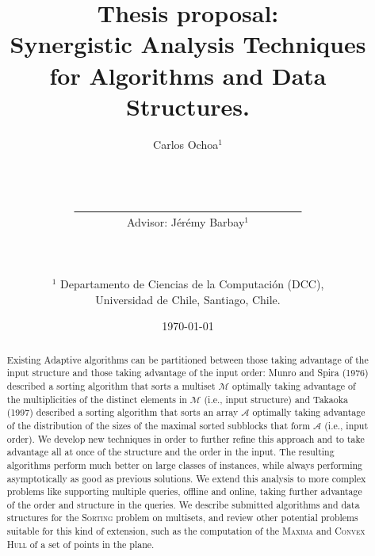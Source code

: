 \documentclass[10pt]{article}
\title{Thesis proposal: \\Synergistic Analysis Techniques\\ for Algorithms and Data Structures.}
\author{Carlos Ochoa$^{1}$
  \\\\\\\\\underline{\ \ \ \ \ \ \ \ \ \ \ \ \ \ \ \ \ \ \ \ \ \ \ \ \
    \ \ \ \ \ \ \ \ \ \ \ \ \ \ \ \ }
  \\Advisor: J\'er\'emy Barbay$^1$\\\\\\\\
  $^1$ Departamento de Ciencias de la Computaci\'on (DCC),\\ Universidad de Chile, Santiago, Chile.
}
\date{\today}
\begin{document}
\maketitle
\begin{abstract}
  Existing Adaptive algorithms can be partitioned between those taking
  advantage of the input structure and those taking advantage of the
  input order: Munro and Spira (1976) described a sorting algorithm
  that sorts a multiset $\mathcal{M}$ optimally taking advantage of
  the multiplicities of the distinct elements in $\mathcal{M}$ (i.e.,
  input structure) and Takaoka (1997) described a sorting algorithm
  that sorts an array $\mathcal{A}$ optimally taking advantage of the
  distribution of the sizes of the maximal sorted subblocks that form
  $\mathcal{A}$ (i.e., input order). We develop new techniques in
  order to further refine this approach and to take advantage all at
  once of the structure and the order in the input. The resulting
  algorithms perform much better on large classes of instances, while
  always performing asymptotically as good as previous solutions. We
  extend this analysis to more complex problems like supporting
  multiple queries, offline and online, taking further advantage of
  the order and structure in the queries. We describe submitted
  algorithms and data structures for the \textsc{Sorting} problem on
  multisets, and review other potential problems suitable for this kind
  of extension, such as the computation of the \textsc{Maxima} and
  \textsc{Convex Hull} of a set of points in the plane.
\end{abstract}
\clearpage





\end{document}
